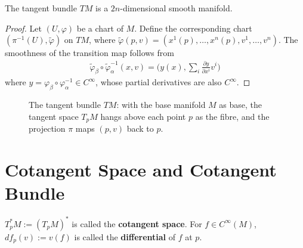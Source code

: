 \begin{proposition}\label{prop:tangent_bundle_manifold}
The tangent bundle $TM$ is a $2n$-dimensional smooth manifold.
\end{proposition}

\begin{proof}
Let $(U, \varphi)$ be a chart of $M$.
Define the corresponding chart $(\pi^{-1}(U), \tilde{\varphi})$ on $TM$,
where
$\tilde{\varphi}(p, v) = (x^1(p), \dots, x^n(p), v^1, \dots, v^n)$.
The smoothness of the transition map follows from
\[
\begin{aligned}
  \tilde{\varphi}_\beta \circ \tilde{\varphi}_\alpha^{-1}(x, v)
  = \bigl(y(x), \sum_i \tfrac{\partial y}{\partial x^i} v^i\bigr)
\end{aligned}
\]
where $y = \varphi_\beta \circ \varphi_\alpha^{-1} \in C^\infty$,
whose partial derivatives are also $C^\infty$.
\end{proof}

\begin{figure}[htbp]
\centering
{}
\caption{The tangent bundle $TM$: with the base manifold $M$ as base, the tangent space $T_pM$ hangs above each point $p$ as the fibre, and the projection $\pi$ maps $(p,v)$ back to $p$.}
\label{fig:tangent_bundle}
\end{figure}

\section{Cotangent Space and Cotangent Bundle}

\begin{definition}\label{def:cotangent_space}
$T_p^*M := (T_pM)^*$ is called the \textbf{cotangent space}. For $f \in C^\infty(M)$, $df_p(v) := v(f)$ is called the \textbf{differential} of $f$ at $p$.
\end{definition}

